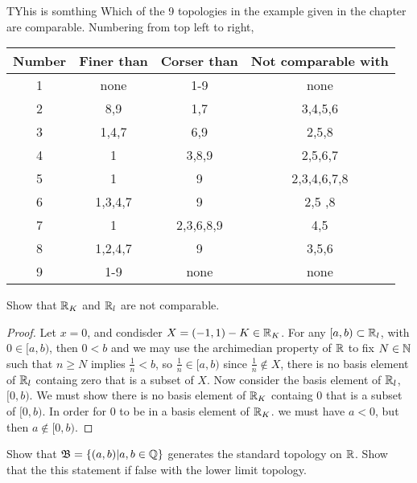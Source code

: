 


\maketitle

\question 
TYhis is somthing Which of the 9 topologies in the example given in the chapter are comparable. Numbering from top left to right, 

\begin{center}
    \begin{tabular}{ |c|c|c|c| } 
     \hline
     Number & Finer than & Corser than& Not comparable with \\ 
     \hline
     1 & none & 1-9 & none \\ 
     \hline
     2 & 8,9 & 1,7 & 3,4,5,6 \\ 
     \hline
     3 &  1,4,7 & 6,9 & 2,5,8 \\ 
     \hline
     4 & 1 & 3,8,9 & 2,5,6,7 \\ 
     \hline
     5 & 1 & 9  & 2,3,4,6,7,8 \\ 
     \hline
     6 & 1,3,4,7 & 9  & 2,5 ,8\\ 
     \hline
     7 & 1 & 2,3,6,8,9  & 4,5 \\ 
     \hline
     8 & 1,2,4,7 & 9  & 3,5,6 \\ 
     \hline
     9 & 1-9 & none  & none \\
     \hline

    \end{tabular}
    \end{center}

\question
Show that $\mathbb{R}_K$ and $\mathbb{R}_l$ are not comparable. 

\begin{proof}
    Let $x = 0$, and condisder $X = (-1, 1) - K \in \mathbb{R}_K$. For any $[a ,b) \subset \mathbb{R}_l$, with $0 \in [a, b)$, then $0 < b$ and we may use the archimedian 
    property of $\mathbb{R}$ to fix $N \in \mathbb{N}$ such that $n \geq N$ implies $\frac{1}{n} < b$, so $\frac{1}{n} \in [a, b)$ since $\frac{1}{n} \notin X$, there is no 
    basis element of $\mathbb{R}_l$ containg zero that is a subset of $X$. Now consider the basis element of $\mathbb{R}_l$, $[0, b)$. We must show there is no 
    basis element of $\mathbb{R}_K$ containg $0$ that is a subset of $[0, b)$. In order for $0$ to be in a basis element of $\mathbb{R}_K$.
    we must have $a < 0$, but then $a \notin [0, b)$. 
\end{proof}

\question 
Show that $\mathfrak{B} = \{(a, b)| a, b \in \mathbb{Q}\}$ generates the standard topology on $\mathbb{R}$. Show that the this statement if false with the lower limit topology.

